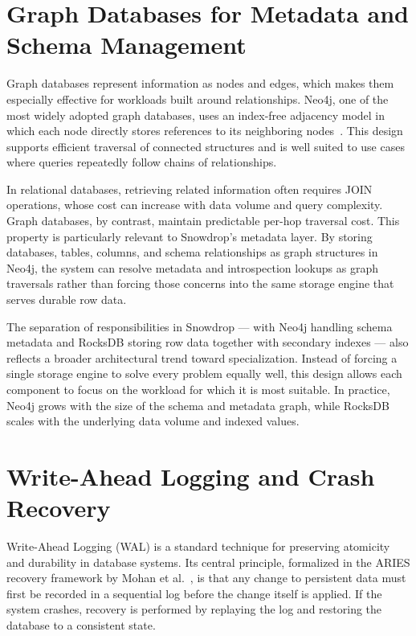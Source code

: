 \section{Graph Databases for Metadata and Schema Management}

Graph databases represent information as nodes and edges, which makes them especially effective for workloads built around relationships. Neo4j, one of the most widely adopted graph databases, uses an index-free adjacency model in which each node directly stores references to its neighboring nodes~\cite{robinson2015}. This design supports efficient traversal of connected structures and is well suited to use cases where queries repeatedly follow chains of relationships.

In relational databases, retrieving related information often requires JOIN operations, whose cost can increase with data volume and query complexity. Graph databases, by contrast, maintain predictable per-hop traversal cost. This property is particularly relevant to Snowdrop's metadata layer. By storing databases, tables, columns, and schema relationships as graph structures in Neo4j, the system can resolve metadata and introspection lookups as graph traversals rather than forcing those concerns into the same storage engine that serves durable row data.

The separation of responsibilities in Snowdrop --- with Neo4j handling schema metadata and RocksDB storing row data together with secondary indexes --- also reflects a broader architectural trend toward specialization. Instead of forcing a single storage engine to solve every problem equally well, this design allows each component to focus on the workload for which it is most suitable. In practice, Neo4j grows with the size of the schema and metadata graph, while RocksDB scales with the underlying data volume and indexed values.

\section{Write-Ahead Logging and Crash Recovery}

Write-Ahead Logging (WAL) is a standard technique for preserving atomicity and durability in database systems. Its central principle, formalized in the ARIES recovery framework by Mohan et al.~\cite{mohan1992}, is that any change to persistent data must first be recorded in a sequential log before the change itself is applied. If the system crashes, recovery is performed by replaying the log and restoring the database to a consistent state.

